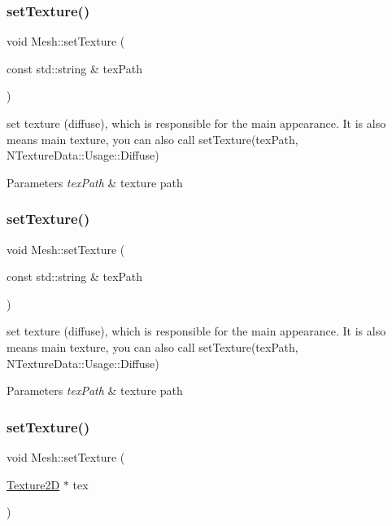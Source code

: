 \subsubsection{\texorpdfstring{set\+Texture()}{setTexture()}\hspace{0.1cm}{\footnotesize\ttfamily [1/8]}}
{\footnotesize\ttfamily void Mesh\+::set\+Texture (\begin{DoxyParamCaption}\item[{const std\+::string \&}]{tex\+Path }\end{DoxyParamCaption})}

set texture (diffuse), which is responsible for the main appearance. It is also means main texture, you can also call set\+Texture(tex\+Path, N\+Texture\+Data\+::\+Usage\+::\+Diffuse) 
\begin{DoxyParams}{Parameters}
{\em tex\+Path} & texture path \\
\hline
\end{DoxyParams}
\mbox{\label{classMesh_a2840f1e3e43c12acf51af1e34398a9a2}} 
\subsubsection{\texorpdfstring{set\+Texture()}{setTexture()}\hspace{0.1cm}{\footnotesize\ttfamily [2/8]}}
{\footnotesize\ttfamily void Mesh\+::set\+Texture (\begin{DoxyParamCaption}\item[{const std\+::string \&}]{tex\+Path }\end{DoxyParamCaption})}

set texture (diffuse), which is responsible for the main appearance. It is also means main texture, you can also call set\+Texture(tex\+Path, N\+Texture\+Data\+::\+Usage\+::\+Diffuse) 
\begin{DoxyParams}{Parameters}
{\em tex\+Path} & texture path \\
\hline
\end{DoxyParams}
\mbox{\label{classMesh_aa3492c9c06f12e024e2b7e1ec6258e0a}} 
\subsubsection{\texorpdfstring{set\+Texture()}{setTexture()}\hspace{0.1cm}{\footnotesize\ttfamily [3/8]}}
{\footnotesize\ttfamily void Mesh\+::set\+Texture (\begin{DoxyParamCaption}\item[{\hyperlink{classTexture2D}{Texture2D} $\ast$}]{tex }\end{DoxyParamCaption})}

